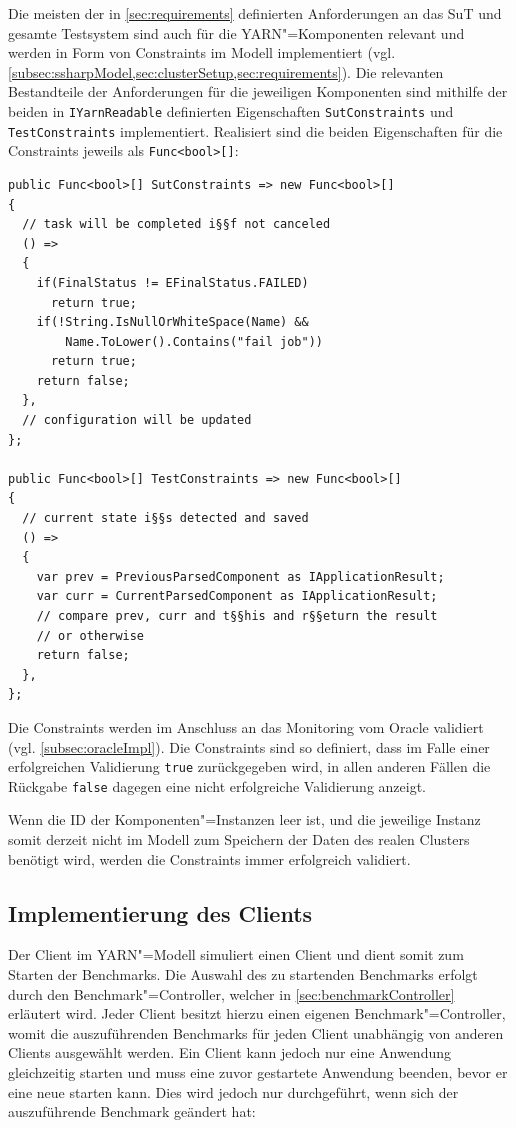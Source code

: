 Die meisten der in \cref{sec:requirements} definierten Anforderungen an das \gls{SuT} und gesamte Testsystem sind auch für die YARN"=Komponenten relevant und werden in Form von Constraints im Modell implementiert (vgl. \cref{subsec:ssharpModel,sec:clusterSetup,sec:requirements}).
Die relevanten Bestandteile der Anforderungen für die jeweiligen Komponenten sind mithilfe der beiden in \texttt{IYarnReadable} definierten Eigenschaften \texttt{SutConstraints} und \texttt{TestConstraints} implementiert.
Realisiert sind die beiden Eigenschaften für die Constraints jeweils als \texttt{Func<bool>[]}:

\begin{lstlisting}[label=lst:constraintDefinition,style=cs,
caption={[Definition der Constraints in YarnApp]
    Definition der Constraints in \texttt{YarnApp} (gekürzt)}]
public Func<bool>[] SutConstraints => new Func<bool>[]
{
  // task will be completed i§§f not canceled
  () =>
  {
    if(FinalStatus != EFinalStatus.FAILED)
      return true;
    if(!String.IsNullOrWhiteSpace(Name) &&
        Name.ToLower().Contains("fail job"))
      return true;
    return false;
  },
  // configuration will be updated
};

public Func<bool>[] TestConstraints => new Func<bool>[]
{
  // current state i§§s detected and saved
  () =>
  {
    var prev = PreviousParsedComponent as IApplicationResult;
    var curr = CurrentParsedComponent as IApplicationResult;
    // compare prev, curr and t§§his and r§§eturn the result
    // or otherwise
    return false;
  },
};
\end{lstlisting}

Die Constraints werden im Anschluss an das Monitoring vom Oracle validiert (vgl. \cref{subsec:oracleImpl}).
Die Constraints sind so definiert, dass im Falle einer erfolgreichen Validierung \texttt{true} zurückgegeben wird, in allen anderen Fällen die Rückgabe \texttt{false} dagegen eine nicht erfolgreiche Validierung anzeigt.

Wenn die ID der Komponenten"=Instanzen leer ist, und die jeweilige Instanz somit derzeit nicht im Modell zum Speichern der Daten des realen Clusters benötigt wird, werden die Constraints immer erfolgreich validiert.

\subsection{Implementierung des Clients}
\label{subsec:yarnClient}

Der Client im YARN"=Modell simuliert einen Client und dient somit zum Starten der Benchmarks.
Die Auswahl des zu startenden Benchmarks erfolgt durch den Benchmark"=Controller, welcher in \cref{sec:benchmarkController} erläutert wird.
Jeder Client besitzt hierzu einen eigenen Benchmark"=Controller, womit die auszuführenden Benchmarks für jeden Client unabhängig von anderen Clients ausgewählt werden.
Ein Client kann jedoch nur eine Anwendung gleichzeitig starten und muss eine zuvor gestartete Anwendung beenden, bevor er eine neue starten kann.
Dies wird jedoch nur durchgeführt, wenn sich der auszuführende Benchmark geändert hat:

